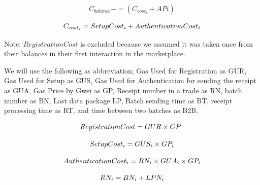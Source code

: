 \documentclass[letterpaper, 10 pt, conference]{ieeeconf}  %
\makeatletter
\newcommand{\mathleft}{\@fleqntrue\@mathmargin15pt}
\makeatother
\begin{document}
\vspace{-0.5 cm}

\mathleft
\begin{equation}
 \textbf{$C_{balance} -= ( C_{cost_{i}} + AP{i} )$}   
\end{equation}

\vspace{-0.5 cm}

\mathleft
\begin{equation}
\textbf{$ C_{cost_{i}} = Setup Cost_{i} + Authentication Cost_{i} $} \label{C_costEq}     
\end{equation}



Note: $ Registration Cost$ is excluded because we assumed it was taken once from their balances in their first interaction in the marketplace. 

We will use the following as abbreviation; Gas Used for Registration as GUR, Gas Used for Setup as GUS, Gas Used for Authentication for sending the receipt as GUA, Gas Price by Gwei as GP, Receipt number in a trade as RN, batch number as BN, Last data package LP, Batch sending time as BT, receipt processing time as RT, and time between two batches as B2B.

\vspace{-0.5 cm}

\mathleft
\begin{equation}
\textbf{$ Registration Cost = GUR \times GP$ }   
\end{equation}

\vspace{-0.5 cm}

\mathleft
\begin{equation}
\textbf{$ Setup Cost_{i} = GUS_{i} \times GP_{i} $}    
\end{equation}

\vspace{-0.5 cm}

\mathleft
\begin{equation}
\textbf{$ Authentication Cost_{i} =  RN_{i} \times GUA_{i} \times GP_{i} $}    
\end{equation}

\vspace{-0.5 cm}

\mathleft
\begin{equation}
\textbf{$ RN _{i} = BN _{i} + LPN _{i} $}   
\end{equation}

\vspace{-0.5 cm}
\end{document}
